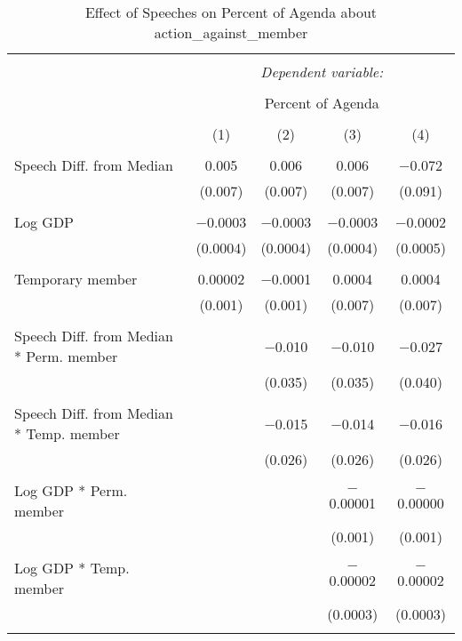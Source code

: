 
\begin{table}[!htbp] \centering 
  \caption{Effect of Speeches on Percent of Agenda about action_against_member} 
  \label{} 
\begin{tabular}{@{\extracolsep{5pt}}lcccc} 
\\[-1.8ex]\hline 
\hline \\[-1.8ex] 
 & \multicolumn{4}{c}{\textit{Dependent variable:}} \\ 
\cline{2-5} 
\\[-1.8ex] & \multicolumn{4}{c}{Percent of Agenda} \\ 
\\[-1.8ex] & (1) & (2) & (3) & (4)\\ 
\hline \\[-1.8ex] 
 Speech Diff. from Median & 0.005 & 0.006 & 0.006 & $-$0.072 \\ 
  & (0.007) & (0.007) & (0.007) & (0.091) \\ 
  & & & & \\ 
 Log GDP & $-$0.0003 & $-$0.0003 & $-$0.0003 & $-$0.0002 \\ 
  & (0.0004) & (0.0004) & (0.0004) & (0.0005) \\ 
  & & & & \\ 
 Temporary member & 0.00002 & $-$0.0001 & 0.0004 & 0.0004 \\ 
  & (0.001) & (0.001) & (0.007) & (0.007) \\ 
  & & & & \\ 
 Speech Diff. from Median * Perm. member &  & $-$0.010 & $-$0.010 & $-$0.027 \\ 
  &  & (0.035) & (0.035) & (0.040) \\ 
  & & & & \\ 
 Speech Diff. from Median * Temp. member &  & $-$0.015 & $-$0.014 & $-$0.016 \\ 
  &  & (0.026) & (0.026) & (0.026) \\ 
  & & & & \\ 
 Log GDP * Perm. member &  &  & $-$0.00001 & $-$0.00000 \\ 
  &  &  & (0.001) & (0.001) \\ 
  & & & & \\ 
 Log GDP * Temp. member &  &  & $-$0.00002 & $-$0.00002 \\ 
  &  &  & (0.0003) & (0.0003) \\ 
  & & & & \\ 

\end{tabular}
\end{table}
